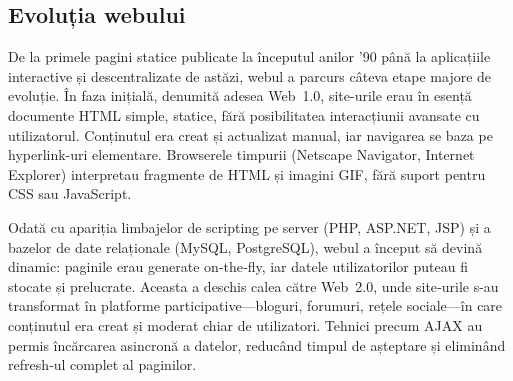 \documentclass[titlepage,12pt]{article}
\begin{document}
    \begin{table}[htb]
        \centering
        \caption{Date tehnice și comparaţie între modele}
    \end{table}

    \subsection{Evoluția webului}

    De la primele pagini statice publicate la începutul anilor ’90 până la aplicațiile interactive și descentralizate de astăzi, webul a parcurs câteva etape majore de evoluție. În faza inițială, denumită adesea Web 1.0, site-urile erau în esență documente HTML simple, statice, fără posibilitatea interacțiunii avansate cu utilizatorul. Conținutul era creat și actualizat manual, iar navigarea se baza pe hyperlink-uri elementare. Browserele timpurii (Netscape Navigator, Internet Explorer) interpretau fragmente de HTML și imagini GIF, fără suport pentru CSS sau JavaScript.

Odată cu apariția limbajelor de scripting pe server (PHP, ASP.NET, JSP) și a bazelor de date relaționale (MySQL, PostgreSQL), webul a început să devină dinamic: paginile erau generate on‑the‑fly, iar datele utilizatorilor puteau fi stocate și prelucrate. Aceasta a deschis calea către Web 2.0, unde site‑urile s-au transformat în platforme participative—bloguri, forumuri, rețele sociale—în care conținutul era creat și moderat chiar de utilizatori. Tehnici precum AJAX au permis încărcarea asincronă a datelor, reducând timpul de așteptare și eliminând refresh‑ul complet al paginilor.
\end{document}
